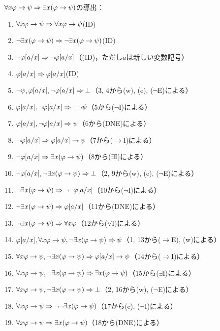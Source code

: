 \(\forall x \varphi \to \psi \sequent \exists x \paren{\varphi \to \psi}\)の導出：
\begin{enumerate}
	\item \(\forall x \varphi \to \psi \Rightarrow \forall x \varphi \to \psi\)\quad (ID)
	\item \(\lnot \exists x \paren{\varphi \to \psi} \sequent \lnot \exists x \paren{\varphi \to \psi}\)\quad (ID)
	\item \(\lnot \subst{\varphi}{a/x} \sequent \lnot \subst{\varphi}{a/x}\)\quad （(ID)，ただし\(a\)は新しい変数記号）
	\item \(\subst{\varphi}{a/x} \sequent \subst{\varphi}{a/x}\)\quad (ID)
	\item \(\lnot \psi, \subst{\varphi}{a/x}, \lnot \subst{\varphi}{a/x} \sequent \bot\)\quad （3, 4から(w), (e), (\(\lnot\)E)による）
	\item \(\subst{\varphi}{a/x}, \lnot \subst{\varphi}{a/x} \sequent \lnot \lnot \psi\)\quad （5から(\(\lnot\)I)による）
	\item \(\subst{\varphi}{a/x}, \lnot \subst{\varphi}{a/x} \sequent \psi\)\quad （6から(DNE)による）
	\item \(\lnot \subst{\varphi}{a/x} \sequent \subst{\varphi}{a/x} \to \psi\)\quad （7から(\(\to\)I)による）
	\item \(\lnot \subst{\varphi}{a/x} \sequent \exists x \paren{\varphi \to \psi}\)\quad （8から(\(\exists\)I)による）
	\item \(\lnot \subst{\varphi}{a/x}, \lnot \exists x \paren{\varphi \to \psi} \sequent \bot\)\quad （2, 9から(w), (e), (\(\lnot\)E)による）
	\item \(\lnot \exists x \paren{\varphi \to \psi} \sequent \lnot \lnot \subst{\varphi}{a/x}\)\quad （10から(\(\lnot\)I)による）
	\item \(\lnot \exists x \paren{\varphi \to \psi} \sequent \subst{\varphi}{a/x}\)\quad （11から(DNE)による）
	\item \(\lnot \exists x \paren{\varphi \to \psi} \sequent \forall x \varphi\)\quad （12から(\(\forall\)I)による）
	\item \(\subst{\varphi}{a/x}, \forall x \varphi \to \psi, \lnot \exists x \paren{\varphi \to \psi} \sequent \psi\)\quad （1, 13から(\(\to\)E), (w)による）
	\item \(\forall x \varphi \to \psi, \lnot \exists x \paren{\varphi \to \psi} \sequent \subst{\varphi}{a/x} \to \psi\)\quad （14から(\(\to\)I)による）
	\item \(\forall x \varphi \to \psi, \lnot \exists x \paren{\varphi \to \psi} \sequent \exists x \paren{\varphi \to \psi}\)\quad （15から(\(\exists\)I)による）
	\item \(\forall x \varphi \to \psi, \lnot \exists x \paren{\varphi \to \psi} \sequent \bot\)\quad （2, 16から(w), (\(\lnot\)E)による）
	\item \(\forall x \varphi \to \psi \sequent \lnot \lnot \exists x \paren{\varphi \to \psi}\)\quad （17から(e), (\(\lnot\)I)による）
	\item \(\forall x \varphi \to \psi \sequent \exists x \paren{\varphi \to \psi}\)\quad （18から(DNE)による）
\end{enumerate}
